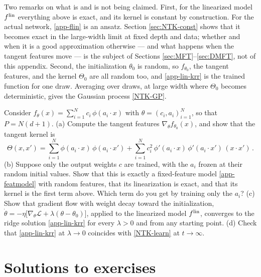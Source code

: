\documentclass[11pt]{article}
\newcommand{\CL}{{\mathcal L}}
\begin{document}
Two remarks on what is and is not being claimed. First, for the linearized model $f^{\rm lin}$ everything above is exact, and its kernel is constant by construction. For the actual network, \eqref{app-flin} is an ansatz. Section \ref{sec:NTK-const} shows that it becomes exact in the large-width limit at fixed depth and data; whether and when it is a good approximation otherwise --- and what happens when the tangent features move --- is the subject of Sections \ref{sec:MFT}--\ref{sec:DMFT}, not of this appendix. Second, the initialization $\theta_0$ is random, so $f_{\theta_0}$, the tangent features, and the kernel $\Theta_0$ are all random too, and \eqref{app-lin-krr} is the trained function for one draw. Averaging over draws, at large width where $\Theta_0$ becomes deterministic, gives the Gaussian process \eqref{NTK-GP}.

\begin{exercise}
\label{ex:app-tangent}
Consider $f_\theta(x) = \sum_{i=1}^N c_i\,\phi(a_i\cdot x)$ with $\theta = (c_i, a_i)_{i=1}^N$, so that $P = N(d+1)$.
(a) Compute the tangent features $\nabla_\theta f_{\theta_0}(x)$, and show that the tangent kernel is
%
\begin{equation*}
    \Theta(x,x') = \sum_{i=1}^N \phi(a_i\cdot x)\,\phi(a_i\cdot x') + \sum_{i=1}^N c_i^2\,\phi'(a_i\cdot x)\,\phi'(a_i\cdot x')\,(x\cdot x')\,.
\end{equation*}
%
(b) Suppose only the output weights $c$ are trained, with the $a_i$ frozen at their random initial values. Show that this is exactly a fixed-feature model \eqref{app-featmodel} with random features, that its linearization is exact, and that its kernel is the first term above. Which term do you get by training only the $a_i$?
(c) Show that gradient flow with weight decay toward the initialization, $\dot\theta = -\eta\big[\nabla_\theta \CL + \lambda(\theta-\theta_0)\big]$, applied to the linearized model $f^{\rm lin}$, converges to the ridge solution \eqref{app-lin-krr} for every $\lambda>0$ and from any starting point.
(d) Check that \eqref{app-lin-krr} at $\lambda\to 0$ coincides with \eqref{NTK-learn} at $t\to\infty$.
\end{exercise}


\section{Solutions to exercises}
\label{app:solutions}
\end{document}
